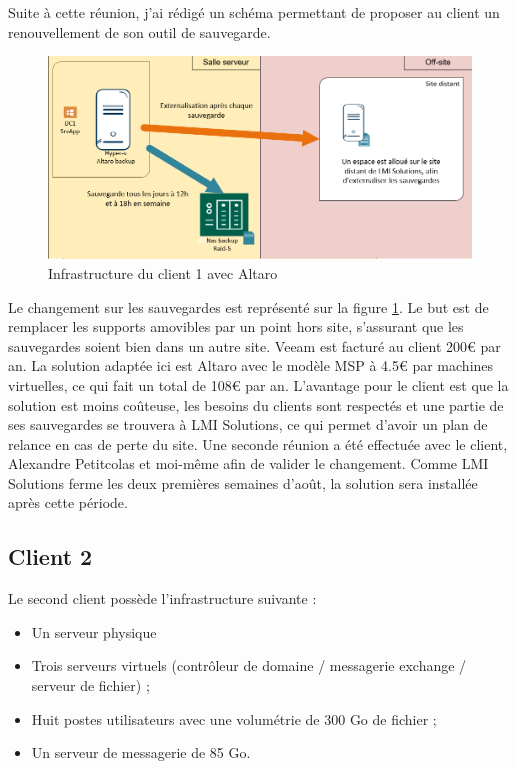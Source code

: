 \documentclass[pfe]{tnreport} %
\begin{document}
Suite à cette réunion, j'ai rédigé un schéma permettant de proposer au client un renouvellement de son outil de sauvegarde. 
\begin{figure}[ht]
 \centering
 \includegraphics[width=15cm]{figures/client1_after.png}
 \caption{Infrastructure du client 1 avec Altaro}
 \label{fig:client1_altaro2}
\end{figure}
Le changement sur les sauvegardes est représenté sur la figure  \ref{fig:client1_altaro2}. Le but est de remplacer les supports amovibles par un point hors site, s'assurant que les sauvegardes soient bien dans un autre site. \newline
Veeam est facturé au client 200€ par an. La solution adaptée ici est Altaro avec le modèle MSP à 4.5€ par machines virtuelles, ce qui fait un total de 108€ par an. \newline
L'avantage pour le client est que la solution est moins coûteuse, les besoins du clients sont respectés et une partie de ses sauvegardes se trouvera à LMI Solutions, ce qui permet d'avoir un plan de relance en cas de perte du site. \newline
Une seconde réunion a été effectuée avec le client, Alexandre Petitcolas et moi-même afin de valider le changement. \newline
Comme LMI Solutions ferme les deux premières semaines d'août, la solution sera installée après cette période.

\subsection{Client 2}

Le second client possède l'infrastructure suivante : \newline
\begin{itemize}
 \item Un serveur physique 
 \item Trois serveurs virtuels (contrôleur de domaine / messagerie exchange / serveur de fichier) ;
\item Huit postes utilisateurs avec une volumétrie de 300 Go de fichier ;
\item Un serveur de messagerie de 85 Go. \newline
\end{itemize}
\end{document}
